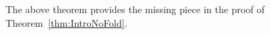 %
%
%






The above theorem provides the missing piece in the proof of Theorem~\ref{thm:IntroNoFold}.

